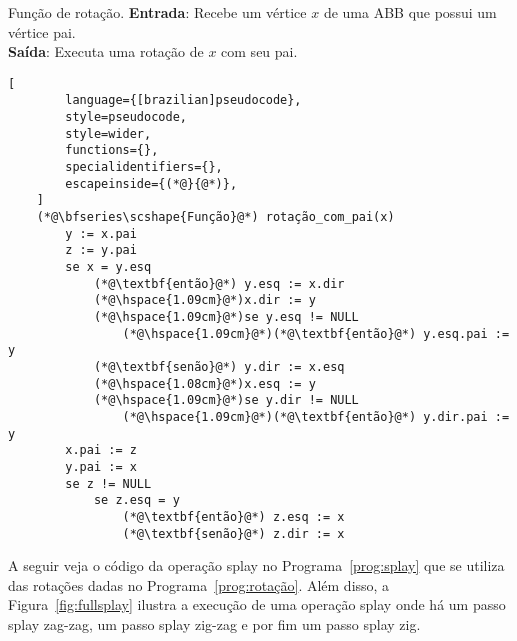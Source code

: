 \begin{programruledcaption}{Função de rotação.\label{prog:rotação}}
    \noindent\textbf{Entrada}: Recebe um vértice $x$ de uma ABB que possui um vértice pai.\\
    \textbf{Saída}: Executa uma rotação de $x$ com seu pai. 
    \vspace{-0.5\baselineskip}
    \begin{lstlisting}[
        language={[brazilian]pseudocode},
        style=pseudocode,
        style=wider,
        functions={},
        specialidentifiers={},
        escapeinside={(*@}{@*)},
    ]
    (*@\bfseries\scshape{Função}@*) rotação_com_pai(x)
        y := x.pai
        z := y.pai
        se x = y.esq
            (*@\textbf{então}@*) y.esq := x.dir
            (*@\hspace{1.09cm}@*)x.dir := y
            (*@\hspace{1.09cm}@*)se y.esq != NULL
                (*@\hspace{1.09cm}@*)(*@\textbf{então}@*) y.esq.pai := y
            (*@\textbf{senão}@*) y.dir := x.esq
            (*@\hspace{1.08cm}@*)x.esq := y
            (*@\hspace{1.09cm}@*)se y.dir != NULL
                (*@\hspace{1.09cm}@*)(*@\textbf{então}@*) y.dir.pai := y
        x.pai := z
        y.pai := x
        se z != NULL
            se z.esq = y
                (*@\textbf{então}@*) z.esq := x
                (*@\textbf{senão}@*) z.dir := x

    \end{lstlisting}
    \vspace{-0.5\baselineskip}
\end{programruledcaption}

A seguir veja o código da operação splay no Programa~\ref{prog:splay} que se utiliza das rotações dadas no Programa~\ref{prog:rotação}. Além disso, a Figura~\ref{fig:fullsplay} ilustra a execução de uma operação splay onde há um passo splay zag-zag, um passo splay zig-zag e por fim um passo splay zig.

